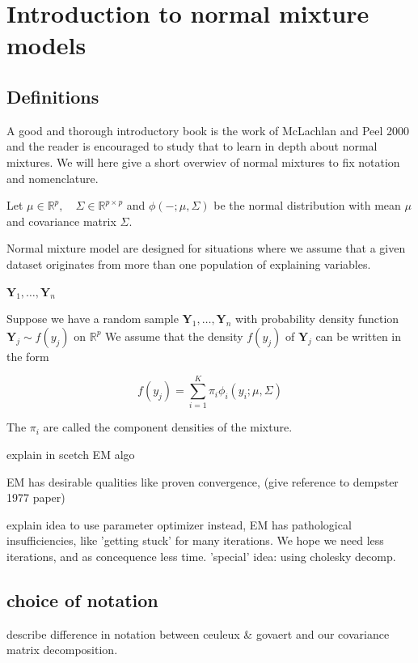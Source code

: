 \chapter{Introduction to normal mixture models}


\section{Definitions}

A good and thorough introductory book is the work of McLachlan and Peel 2000 and the reader is encouraged to study that to learn in depth about normal mixtures. We will here give a short overwiev of normal mixtures to fix notation and nomenclature.

Let $ \mu \in \mathbb{R}^p , \quad \Sigma \in \mathbb{R}^{p \times p} $ and $ \phi(- ; \mu, \Sigma) $ be the normal distribution with mean $ \mu $ and covariance matrix $ \Sigma $.

Normal mixture model are designed for situations where we assume that a given dataset originates from more than one population of explaining variables.

$ \pmb{Y}_1, \dots , \pmb{Y}_n $

\begin{definition}
    Suppose we have a random sample $ \pmb{Y}_1, \dots , \pmb{Y}_n $ with probability density function $ \pmb{Y}_j \sim f(y_j) $ on $\mathbb{R}^p$ We assume that the density $ f(y_j) $ of $ \pmb{Y}_j $ can be written in the form 

    \[ f(y_j) = \sum_{i=1}^{K} \pi_i \phi_i (y_i; \mu, \Sigma) \]

    The $ \pi_i $ are called the component densities of the mixture.
\end{definition}

explain in scetch EM algo

EM has desirable qualities like proven convergence, (give reference to dempster 1977 paper)

explain idea to use parameter optimizer instead, EM has pathological insufficiencies, like 'getting stuck' for many iterations. We hope we need less iterations, and as concequence less time. 'special' idea: using cholesky decomp.


\section{choice of notation}

describe difference in notation between ceuleux \& govaert and our covariance matrix decomposition.

